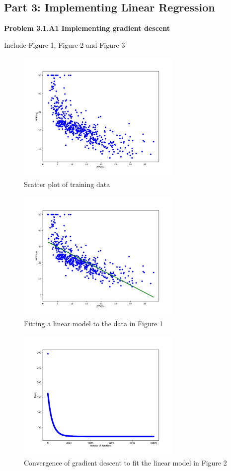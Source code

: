 \documentclass[]{book}
\theoremstyle{definition}
\begin{document}
\subsection*{Part 3: Implementing Linear Regression}
\vspace{4mm}
\textbf{Problem 3.1.A1 Implementing gradient descent}
\begin{flushleft}
	Include Figure 1, Figure 2 and Figure 3
\end{flushleft}
\begin{figure}[H]
	\centering
	\includegraphics[width=8cm]{fig1.pdf}
	\caption{Scatter plot of training data}
	\label{fig:1}
\end{figure}
\begin{figure}[H]
	\centering 
	\includegraphics[width=8cm]{fig2a.pdf}
	\caption{Fitting a linear model to the data in Figure 1}
	\label{fig:2}
\end{figure}
\begin{figure}[H]
	\centering
	\includegraphics[width=8cm]{fig2b.pdf}
	\caption{Convergence of gradient descent to fit the linear model in Figure 2}
	\label{fig:3}
\end{figure}
\end{document}
